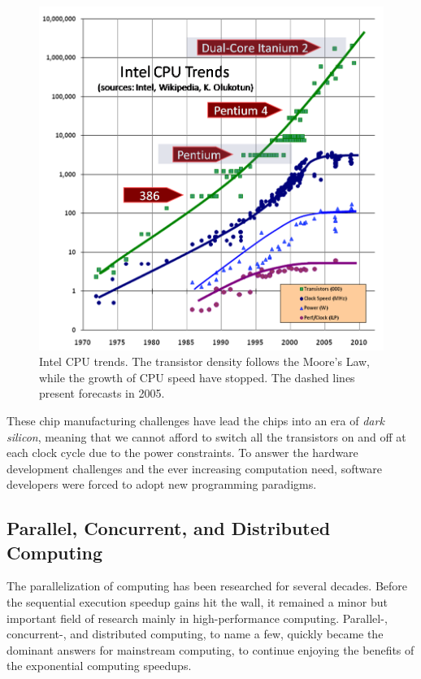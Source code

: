 \begin{figure}[]
  \begin{center}
    \includegraphics[width=\textwidth]{images/free-lunch-is-over.png}
    \caption{Intel CPU trends. The transistor density follows the Moore's Law, while the growth of CPU speed have stopped. The dashed lines present forecasts in 2005.~\cite{Sutter:2005:FLiO}}
    \label{fig:rne-example}
  \end{center}
\end{figure}

These chip manufacturing challenges have lead the chips into an era of \emph{dark silicon}, meaning that we cannot afford to switch all the transistors on and off at each clock cycle due to the power constraints. To answer the hardware development challenges and the ever increasing computation need, software developers were forced to adopt new programming paradigms.~\cite{Sutter:2005:FLiO}

\subsection{Parallel, Concurrent, and Distributed Computing}
\label{subsection:parallel-concurrent-and-distributed-computing}

The parallelization of computing has been researched for several decades. Before the sequential execution speedup gains hit the wall, it remained a minor but important field of research mainly in high-performance computing. Parallel-, concurrent-, and distributed computing, to name a few, quickly became the dominant answers for mainstream computing, to continue enjoying the benefits of the exponential computing speedups.

